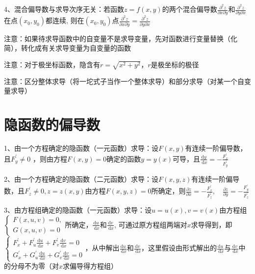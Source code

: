 4、混合偏导数与求导次序无关：若函数$z=f(x, y)$的两个混合偏导数$\frac{\partial^{2} z}{\partial x \partial y}$和$\frac{\partial^{2} z}{\partial y \partial x}$在点$\left(x_{0}, y_{0}\right)$都连续, 则在$\left(x_{0}, y_{0}\right)$点$\frac{\partial^{2} z}{\partial x \partial y}=\frac{\partial^{2} z}{\partial y \partial x}$

注意：如果待求导函数中的自变量不是求导变量，先对函数进行变量替换（化简），转化成有关求导变量为自变量的函数

注意：对于极坐标函数，隐含有$r=\sqrt{x^2+y^2}$，$r$是极坐标的极径

注意：区分整体求导（将一坨式子当作一个整体求导）和部分求导（对某一个自变量求导）

\section{隐函数的偏导数}

1、由一个方程确定的隐函数（一元函数）求导：设$F(x, y)$有连续一阶偏导数，且$F_{y}^{\prime} \neq 0$ ，则由方程$F(x, y)=0$确定的函数$y=y(x)$可导，且$\frac{\mathrm{d} y}{\mathrm{~d} x}=-\frac{F_{x}^{\prime}}{F_{y}^{\prime}}$

2、由一个方程确定的隐函数（二元函数）求导：设$F(x, y, z)$有连续一阶偏导数，且$F_{z}^{\prime} \neq 0, z=z(x, y)$由方程$F(x, y, z)=0$所确定，则$\frac{\partial z}{\partial x}=-\frac{F_{x}^{\prime}}{F_{z}^{\prime}}, \quad \frac{\partial z}{\partial y}=-\frac{F_{y}^{\prime}}{F_{z}^{\prime}}$

3、由方程组确定的隐函数（一元函数）求导：设$u=u(x), v=v(x)$由方程组$\left\{\begin{array}{l}F(x, u, v)=0,  \\ G(x, u, v)=0\end{array}\right. $所确定，$\frac{\mathrm{d} u}{\mathrm{~d} x}$和$\frac{\mathrm{d} v}{\mathrm{~d} x}$, 可通过原方程组两端对$x$求导得到，即$\left\{\begin{array}{l} F_{x}^{\prime}+F_{u}^{\prime} \frac{\mathrm{d} u}{\mathrm{~d} x}+F_{v}^{\prime} \frac{\mathrm{d} v}{\mathrm{~d} x}=0 \\ G_{x}^{\prime}+G_{u}^{\prime} \frac{\mathrm{d} u}{\mathrm{~d} x}+G_{v}^{\prime} \frac{\mathrm{d} v}{\mathrm{~d} x}=0 \end{array}\right.$，从中解出$\frac{\mathrm{d} u}{\mathrm{~d} x}$和$\frac{\mathrm{d} v}{\mathrm{~d} x}$，这里假设由形式解出的$\frac{\mathrm{d} u}{\mathrm{~d} x}$与$\frac{\mathrm{d} v}{\mathrm{~d} x}$中的分母不为零（对$x$求偏导得方程组）

